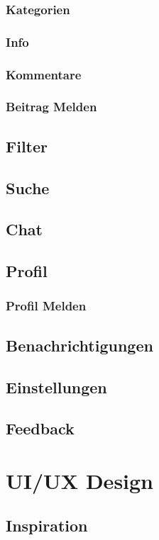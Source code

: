 \subsubsection{Kategorien}

\subsubsection{Info}
\subsubsection{Kommentare}
\subsubsection{Beitrag Melden}


\subsection{Filter}
\subsection{Suche}
\subsection{Chat}
\subsection{Profil}
\subsubsection{Profil Melden}

\subsection{Benachrichtigungen}
\subsection{Einstellungen}
\subsection{Feedback}


\section{UI/UX Design}
\subsection{Inspiration}

